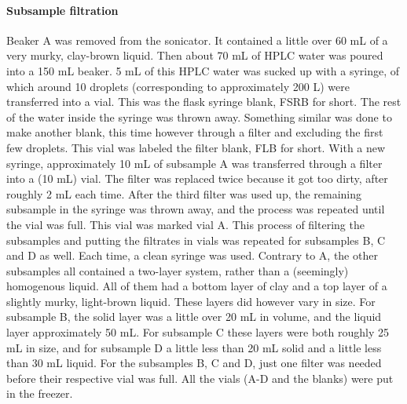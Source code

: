 \documentclass[twocolumn,a4paper,aps,amsmath,amssymb,floatfix,superscriptaddress]{revtex4-2}
\begin{document}
	\paragraph{Subsample filtration}
	Beaker A was removed from the sonicator. It contained a little over 60 mL of a very murky, clay-brown liquid. 
	Then about 70 mL of HPLC water was poured into a 150 mL beaker. 5 mL of this HPLC water was sucked up with a syringe, of which around 10 droplets (corresponding to approximately 200 \mu L) were transferred into a vial. This was the flask syringe blank, FSRB for short. The rest of the water inside the syringe was thrown away. Something similar was done to make another blank, this time however through a filter and excluding the first few droplets. This vial was labeled the filter blank, FLB for short.
	With a new syringe, approximately 10 mL of subsample A was transferred through a filter into a (10 mL) vial. The filter was replaced twice because it got too dirty, after roughly 2 mL each time. After the third filter was used up, the remaining subsample in the syringe was thrown away, and the process was repeated until the vial was full. This vial was marked vial A. 
	This process of filtering the subsamples and putting the filtrates in vials was repeated for subsamples B, C and D as well. Each time, a clean syringe was used. Contrary to A, the other subsamples all contained a two-layer system, rather than a (seemingly) homogenous liquid. All of them had a bottom layer of clay and a top layer of a slightly murky, light-brown liquid. These layers did however vary in size. For subsample B, the solid layer was a little over 20 mL in volume, and the liquid layer approximately 50 mL. For subsample C these layers were both roughly 25 mL in size, and for subsample D a little less than 20 mL solid and a little less than 30 mL liquid. For the subsamples B, C and D, just one filter was needed before their respective vial was full.
	All the vials (A-D and the blanks) were put in the freezer.
\end{document}
